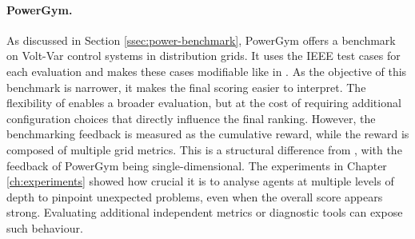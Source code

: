 \paragraph{PowerGym.}
As discussed in Section \ref{ssec:power-benchmark}, PowerGym offers a benchmark on Volt-Var control systems in distribution grids. It uses the IEEE test cases for each evaluation and makes these cases modifiable like in \benchmark. As the objective of this benchmark is narrower, it makes the final scoring easier to interpret. The flexibility of \benchmark enables a broader evaluation, but at the cost of requiring additional configuration choices that directly influence the final ranking. However, the benchmarking feedback is measured as the cumulative reward, while the reward is composed of multiple grid metrics. This is a structural difference from \benchmark, with the feedback of PowerGym being single-dimensional. The experiments in Chapter \ref{ch:experiments} showed how crucial it is to analyse agents at multiple levels of depth to pinpoint unexpected problems, even when the overall score appears strong. Evaluating additional independent metrics or diagnostic tools can expose such behaviour.

